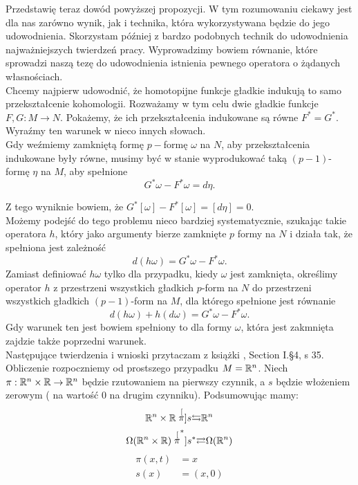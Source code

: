 \documentclass[licencjacka]{pracamgr}
\theoremstyle{definition}
\theoremstyle{definition}
\theoremstyle{plain}
\theoremstyle{plain}
\theoremstyle{plain}
\theoremstyle{plain}
\def\R{\ensuremath\mathbb{R}}
\begin{document}
Przedstawię teraz dowód powyższej propozycji.  W tym rozumowaniu ciekawy jest
dla nas zarówno wynik, jak i technika, która wykorzystywana będzie do jego
udowodnienia.  Skorzystam później z bardzo podobnych technik do udowodnienia
najważniejszych twierdzeń pracy.  Wyprowadzimy bowiem równanie, które sprowadzi
naszą tezę do udowodnienia istnienia pewnego operatora o żądanych własnościach.  \\

Chcemy najpierw udowodnić, że homotopijne funkcje gładkie indukują to samo
przekształcenie kohomologii.  Rozważamy w tym celu dwie gładkie funkcje $F, G:
M \rightarrow N$.  Pokażemy, że ich przekształcenia indukowane są równe
$F^\ast = G^\ast$. Wyraźmy ten warunek w nieco innych słowach. \\

Gdy weźmiemy zamkniętą formę $p-$formę $\omega$ na $N$, aby
przekształcenia indukowane były równe, musimy być w stanie
wyprodukować taką $(p-1)$-formę $\eta$ na $M$, aby spełnione
\[
    G^\ast \omega - F^\ast \omega = d\eta.
\]

Z tego wyniknie bowiem, że
$ G^\ast [\omega] - F^\ast [\omega] =
[d\eta] = 0$. \\

Możemy podejść do tego problemu nieco bardziej systematycznie, 
szukając takie operatora
$h$, który jako argumenty bierze zamknięte $p$ formy na $N$
i działa tak, że spełniona jest zależność
\[
    d(h\omega) = G^\ast \omega - F^\ast \omega.
\] 
Zamiast definiować $h \omega$ tylko dla przypadku, kiedy $\omega$
jest zamknięta, określimy operator
$h$ z przestrzeni wszystkich gładkich $p$-form na $N$
do przestrzeni wszystkich gładkich $(p-1)$-form na $M$,
dla którego spełnione jest równanie
\[
    d(h\omega) + h(d\omega) = G^\ast \omega - F^\ast \omega.
\]
Gdy warunek ten jest bowiem spełniony to dla formy $\omega$, która
jest zakmnięta zajdzie także poprzedni warunek. \\

Następujące twierdzenia i wnioski przytaczam z książki \cite{bott}, Section
I.\S4, s 35. \\

Obliczenie rozpoczniemy od prostszego przypadku $M = \R^n$.
Niech $\pi: \R^n \times \R \rightarrow \R^n$  będzie rzutowaniem
na pierwszy czynnik, a $s$  będzie włożeniem zerowym (
na wartość $0$ na drugim czynniku). Podsumowując mamy:
\[
 \R^n \times \R
 \stackrel[\pi]{s}{\leftrightarrows} 
 \R^n
\]
\[
 \Omega (\R^n \times \R)
 \stackrel[\pi^\ast]{s^\ast}{\rightleftarrows} 
 \Omega(\R^n)
\]
\begin{align*}
    \pi(x, t) &= x \\
         s(x) &= (x, 0)
\end{align*}
\end{document}
